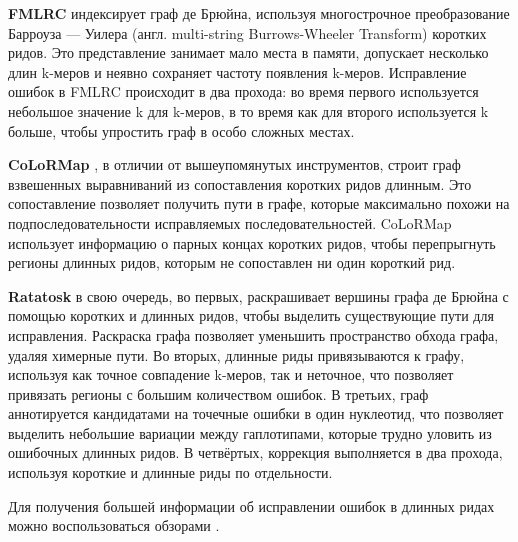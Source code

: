 \documentclass[14pt]{matmex-diploma-custom}
\begin{document}
\textbf{FMLRC} \cite{art:wang2018fmlrc} индексирует граф де Брюйна, используя многострочное преобразование Барроуза — Уилера (англ. multi-string Burrows-Wheeler Transform) коротких ридов. Это представление занимает мало места в памяти, допускает несколько длин k-меров и неявно сохраняет частоту появления k-меров. Исправление ошибок в FMLRC происходит в два прохода: во время первого используется небольшое значение k для k-меров, в то время как для второго используется k больше, чтобы упростить граф в особо сложных местах.

\textbf{CoLoRMap} \cite{art:haghshenas2016colormap}, в отличии от вышеупомянутых инструментов, строит граф взвешенных выравниваний из сопоставления коротких ридов длинным. Это сопоставление позволяет получить пути в графе, которые максимально похожи на подпоследовательности исправляемых последовательностей. CoLoRMap использует информацию о парных концах коротких ридов, чтобы перепрыгнуть регионы длинных ридов, которым не сопоставлен ни один короткий рид.

\textbf{Ratatosk} \cite{art:holley2021ratatosk} в свою очередь, во первых, раскрашивает вершины графа де Брюйна с помощью коротких и длинных ридов, чтобы выделить существующие пути для исправления. Раскраска графа позволяет уменьшить пространство обхода графа, удаляя химерные пути.
Во вторых, длинные риды привязываются к графу, используя как точное совпадение k-меров, так и неточное, что позволяет привязать регионы с большим количеством ошибок. В третьих, граф аннотируется кандидатами на точечные ошибки в один нуклеотид, что позволяет выделить небольшие вариации между гаплотипами, которые трудно уловить из ошибочных длинных ридов. В четвёртых, коррекция выполняется в два прохода, используя короткие и длинные риды по отдельности.

Для получения большей информации об исправлении ошибок в длинных ридах можно воспользоваться обзорами \cite{art:morisse2020long, art:zook2016extensive, art:zhang2020comprehensive}.


\end{document}
